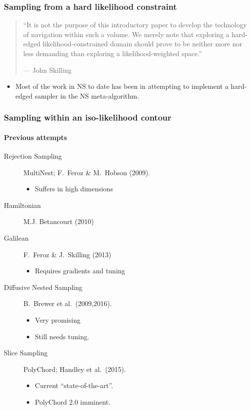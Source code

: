 \documentclass[%
]{beamer}
\begin{document}
\begin{frame}
  \frametitle{Sampling from a hard likelihood constraint} 

  
  \begin{quote}
    ``It is not the purpose of this introductory paper to develop the technology of navigation within such a volume. We merely note that exploring a hard-edged likelihood-constrained domain should prove to be neither more nor less demanding than exploring a likelihood-weighted space.''
    
   {\hfill --- John Skilling}
  \end{quote}

  \begin{itemize}
      
    \item Most of the work in NS to date has been in attempting to implement a hard-edged sampler in the NS meta-algorithm.
  \end{itemize}
 
\end{frame}


\begin{frame}
  \frametitle{Sampling within an iso-likelihood contour}
  \framesubtitle{Previous attempts}


  \begin{description}
    \item[Rejection Sampling] MultiNest; F.\ Feroz \& M.\ Hobson (2009).
      \begin{itemize}
        \item Suffers in high dimensions
      \end{itemize}
      \item[Hamiltonian] M.J. Betancourt (2010) 
      \item[Galilean] F.\ Feroz \& J.\ Skilling (2013) 
      \begin{itemize}
        \item Requires gradients and tuning
      \end{itemize}
      \item[Diffusive Nested Sampling] B.\ Brewer et al.\ (2009,2016).
      \begin{itemize}
        \item Very promising
        \item Still needs tuning.
      \end{itemize}
      \item[Slice Sampling] PolyChord; Handley et al.\ (2015).
      \begin{itemize}
          \item Current ``state-of-the-art''.
          \item PolyChord 2.0 imminent.
      \end{itemize}
  \end{description}

\end{frame}
\end{document}

